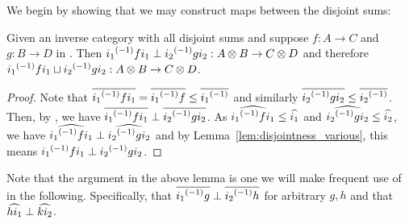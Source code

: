 We begin by showing that we may construct maps between the disjoint sums:
\begin{lemma}\label{lem:disjoint_sum_maps_are_perp}
  Given \X an inverse category with all disjoint sums and suppose $f:A \to C$ and $g:B\to D$ in
  \X. Then  ${i_1}^{(-1)} f i_1 \perp {i_2}^{(-1)} g i_2 : A\otimes B\to C\otimes D$ and therefore
  ${i_1}^{(-1)} f i_1 \sqcup {i_2}^{(-1)} g i_2 : A\otimes B\to C\otimes D$.
\end{lemma}
\begin{proof}
  Note that $\overline{{i_1}^{(-1)} f i_1} = \overline{{i_1}^{(-1)} f} \le \overline{{i_1}^{(-1)}}$ and similarly
  $\overline{{i_2}^{(-1)} g i_2} \le \overline{{i_2}^{(-1)}}$. Then, by , we have
  $\overline{{i_1}^{(-1)} f i_1} \perp \overline{{i_2}^{(-1)} g i_2}$.
  As $\widehat{{i_1}^{(-1)} f i_1} \le \widehat{i_1}$ and  $\widehat{{i_2}^{(-1)} g i_2} \le \widehat{i_2}$, we
  have $\widehat{{i_1}^{(-1)} f i_1} \perp \widehat{{i_2}^{(-1)} g i_2}$ and by
  Lemma~\ref{lem:disjointness_various}, this means  ${i_1}^{(-1)} f i_1\perp {i_2}^{(-1)} g i_2$.
\end{proof}

Note that the argument in the above lemma is one we will make frequent use of in the
following. Specifically, that $\overline{{i_1}^{(-1)} g} \perp \overline{{i_2}^{(-1)} h}$ for arbitrary $g,h$ and
that $\widehat{h i_1} \perp \widehat{k i_2}$.

